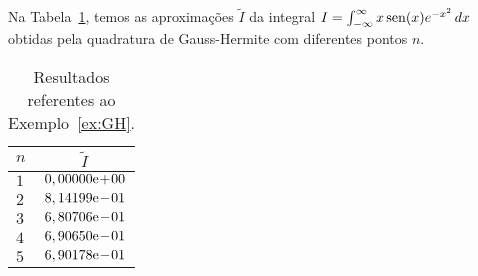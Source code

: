 
\begin{ex}\label{ex:GH}
  Na Tabela~\ref{tab:ex_GH}, temos as aproximações $\tilde{I}$ da integral $I = \int_{-\infty}^\infty x\operatorname{sen}(x)e^{-x^2}\,dx$ obtidas pela quadratura de Gauss-Hermite com diferentes pontos $n$.

\begin{table}[h!]
  \centering
  \begin{tabular}{lc}
    $n$ & $\tilde{I}$\\\hline
    $1$ & $0,00000\mathrm{e}\!+\!00$ \\
    $2$ & $8,14199\mathrm{e}\!-\!01$ \\
    $3$ & $6,80706\mathrm{e}\!-\!01$ \\
    $4$ & $6,90650\mathrm{e}\!-\!01$ \\
    $5$ & $6,90178\mathrm{e}\!-\!01$
  \end{tabular}
  \caption{Resultados referentes ao Exemplo~\ref{ex:GH}.}
  \label{tab:ex_GH}
\end{table}






\end{ex}

